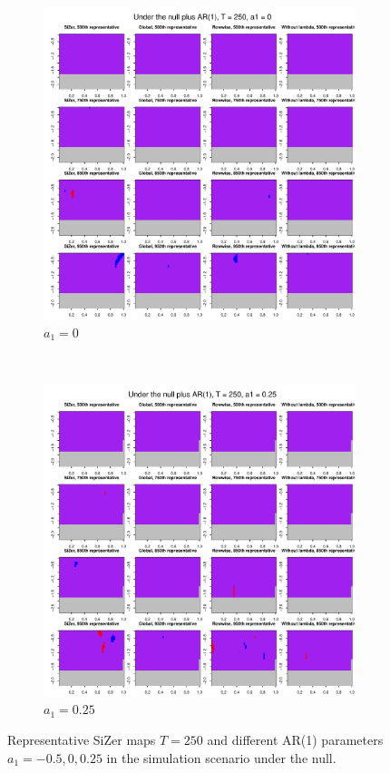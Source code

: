 \documentclass[a4paper,12pt]{article}
\begin{document}
\begin{figure}[t!]
\begin{subfigure}[b]{0.475\textwidth}
\includegraphics[width=\textwidth]{Plots/representatives_T_250_a1_0_slope_0.pdf}
\caption{$a_1 = 0$}
\end{subfigure}\\
\begin{subfigure}[b]{0.475\textwidth}
\includegraphics[width=\textwidth]{Plots/representatives_T_250_a1_25_slope_0.pdf}
\caption{$a_1 = 0.25$}
\end{subfigure}
\caption{Representative SiZer maps $T = 250$ and different AR(1) parameters $a_1 = -0.5, 0, 0.25$ in the simulation scenario under the null.}\label{fig:Representative_SiZer_maps}
\end{figure}



{\small
\setlength{\bibsep}{0.55em}
}
\end{document}

